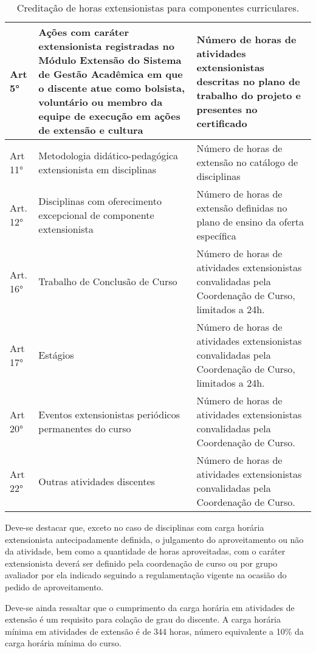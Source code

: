 \begin{table}[h!]
   \caption{Creditação de horas extensionistas para componentes curriculares.}
   \label{tab:componentes-ext}\centering
   \begin{tabular}{|p{}|p{}|p{}|}
      \hline
      Art 5°
      &
        Ações  com caráter  extensionista  registradas no  Módulo Extensão  do
        Sistema  de Gestão  Acadêmica em  que o  discente atue  como bolsista,
        voluntário ou  membro da  equipe de  execução em  ações de  extensão e
        cultura
      &
        Número de horas de atividades extensionistas descritas no plano de
        trabalho do projeto e presentes no certificado
      \\
      \hline
      Art 11°
      &
        Metodologia didático-pedagógica extensionista em disciplinas
      &
        Número de horas de extensão no catálogo de disciplinas
      \\
      \hline
      Art. 12°
      &
        Disciplinas com oferecimento excepcional de componente extensionista
      &
        Número de horas de extensão definidas no plano de ensino da oferta
        específica
     \\
           \hline
      Art. 16°
      &
        Trabalho de Conclusão de Curso
      &
        Número de horas de atividades extensionistas convalidadas pela
        Coordenação de Curso, limitados a 24h.
      \\

      \hline
      Art 17°
      &
        Estágios
      &
        Número de horas de atividades extensionistas convalidadas pela
        Coordenação de Curso, limitados a 24h.
      \\
      \hline
      Art 20°
      &
        Eventos extensionistas periódicos permanentes do curso
      &
        Número  de  horas  de   atividades  extensionistas  convalidadas  pela
        Coordenação de Curso.
      \\
      \hline
      Art 22°
      &
        Outras atividades discentes
      &
        Número de horas de atividades extensionistas convalidadas pela
        Coordenação de Curso.
      \\
      \hline
    \end{tabular}
  \end{table}

Deve-se destacar que, exceto no caso de disciplinas com carga horária
extensionista antecipadamente definida, o julgamento do aproveitamento
ou não da atividade, bem como a quantidade de horas aproveitadas, com
o caráter extensionista deverá ser definido pela coordenação de curso
ou por grupo avaliador por ela indicado seguindo a regulamentação
vigente na ocasião do pedido de aproveitamento.

Deve-se ainda ressaltar que o cumprimento da carga horária em
atividades de extensão é um requisito para colação de grau do
discente. A carga horária mínima em atividades de extensão é de 344
horas, número equivalente a 10\% da carga horária mínima do curso.
